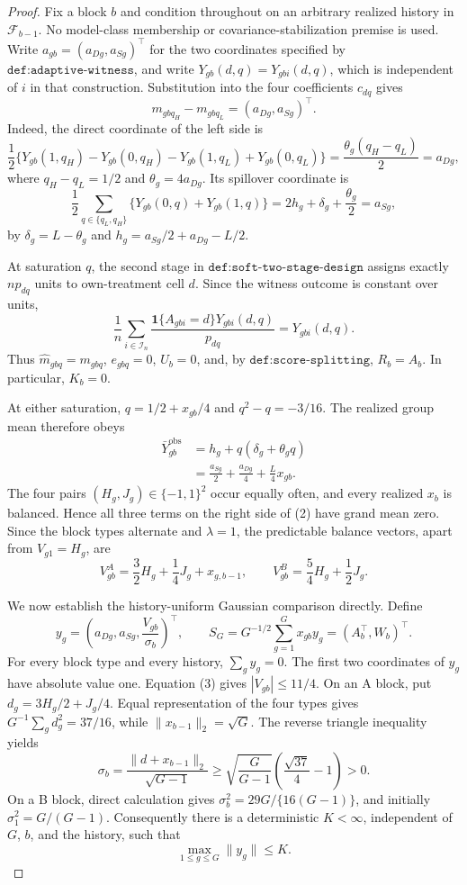 \documentclass{article}
\begin{document}
\begin{proof}
Fix a block \(b\) and condition throughout on an arbitrary realized history in \(\mathcal F_{b-1}\).  No model-class membership or covariance-stabilization premise is used.  Write \(a_{gb}=(a_{Dg},a_{Sg})^\top\) for the two coordinates specified by \(\texttt{def:adaptive-witness}\), and write \(Y_{gb}(d,q)=Y_{gbi}(d,q)\), which is independent of \(i\) in that construction.  Substitution into the four coefficients \(c_{dq}\) gives
\[
m_{gbq_H}-m_{gbq_L}=(a_{Dg},a_{Sg})^\top.                 \tag{1}
\]
Indeed, the direct coordinate of the left side is
\[
\frac12\{Y_{gb}(1,q_H)-Y_{gb}(0,q_H)
             -Y_{gb}(1,q_L)+Y_{gb}(0,q_L)\}
=\frac{\theta_g(q_H-q_L)}2=a_{Dg},
\]
where \(q_H-q_L=1/2\) and \(\theta_g=4a_{Dg}\).  Its spillover coordinate is
\[
\frac12\sum_{q\in\{q_L,q_H\}}\{Y_{gb}(0,q)+Y_{gb}(1,q)\}
=2h_g+\delta_g+\frac{\theta_g}{2}=a_{Sg},
\]
by \(\delta_g=L-\theta_g\) and \(h_g=a_{Sg}/2+a_{Dg}-L/2\).

At saturation \(q\), the second stage in \(\texttt{def:soft-two-stage-design}\) assigns exactly \(np_{dq}\) units to own-treatment cell \(d\).  Since the witness outcome is constant over units,
\[
\frac1n\sum_{i\in\mathcal I_n}
 \frac{\mathbf 1\{A_{gbi}=d\}Y_{gbi}(d,q)}{p_{dq}}
=Y_{gbi}(d,q).
\]
Thus \(\widehat m_{gbq}=m_{gbq}\), \(e_{gbq}=0\), \(U_b=0\), and, by \(\texttt{def:score-splitting}\), \(R_b=A_b\).  In particular, \(K_b=0\).

At either saturation, \(q=1/2+x_{gb}/4\) and \(q^2-q=-3/16\).  The realized group mean therefore obeys
\[
\begin{aligned}
\bar Y^{\mathrm{obs}}_{gb}
&=h_g+q(\delta_g+\theta_gq)\\
&=\frac{a_{Sg}}2+\frac{a_{Dg}}4+\frac L4x_{gb}.
\end{aligned}                                               \tag{2}
\]
The four pairs \((H_g,J_g)\in\{-1,1\}^2\) occur equally often, and every realized \(x_b\) is balanced.  Hence all three terms on the right side of (2) have grand mean zero.  Since the block types alternate and \(\lambda=1\), the predictable balance vectors, apart from \(V_{g1}=H_g\), are
\[
V_{gb}^{A}=\frac32H_g+\frac14J_g+x_{g,b-1},
\qquad
V_{gb}^{B}=\frac54H_g+\frac12J_g.                        \tag{3}
\]

We now establish the history-uniform Gaussian comparison directly.  Define
\[
y_g=\left(a_{Dg},a_{Sg},\frac{V_{gb}}{\sigma_b}\right)^\top,
\qquad
S_G=G^{-1/2}\sum_{g=1}^Gx_{gb}y_g=(A_b^\top,W_b)^\top.
\]
For every block type and every history, \(\sum_gy_g=0\).  The first two coordinates of \(y_g\) have absolute value one.  Equation (3) gives \(|V_{gb}|\leq11/4\).  On an A block, put \(d_g=3H_g/2+J_g/4\).  Equal representation of the four types gives \(G^{-1}\sum_gd_g^2=37/16\), while \(\|x_{b-1}\|_2=\sqrt G\).  The reverse triangle inequality yields
\[
\sigma_b=\frac{\|d+x_{b-1}\|_2}{\sqrt{G-1}}
\geq\sqrt{\frac G{G-1}}\left(\frac{\sqrt{37}}4-1\right)>0. \tag{4}
\]
On a B block, direct calculation gives \(\sigma_b^2=29G/\{16(G-1)\}\), and initially \(\sigma_1^2=G/(G-1)\).  Consequently there is a deterministic \(K<\infty\), independent of \(G\), \(b\), and the history, such that
\[
\max_{1\leq g\leq G}\|y_g\|\leq K.                     \tag{5}
\]


\end{proof}
\end{document}
